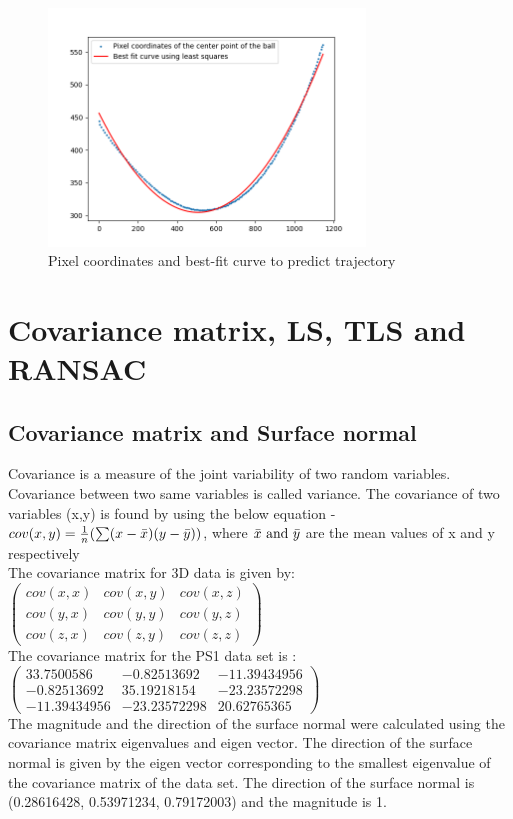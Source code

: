 \begin{figure}[!h]
    \centering
    \includegraphics[width=0.75\textwidth]{txt/Proj1_1.png}
    \caption{Pixel coordinates and best-fit curve to predict trajectory}
    \label{fig:my_label} 
\end{figure} 

\section{Covariance matrix, LS, TLS and RANSAC}
\subsection{Covariance matrix and Surface normal}
  Covariance is a measure of the joint variability of two random variables. Covariance between two same variables is called variance. The covariance of two variables (x,y) is found by using the below equation - \\
$cov(x,y) = \frac{1}{n} (\sum (x - \Bar{x})(y - \Bar{y}))$, where $\Bar{x} \text{ and } \Bar{y}$ are the mean values of x and y respectively\\
 The covariance matrix for 3D data is given by:
 $
 \begin{pmatrix}
     cov(x, x) & cov(x, y) & cov(x, z) \\
     cov(y, x) & cov(y, y) & cov(y, z) \\
     cov(z, x) & cov(z, y) & cov(z, z)
 \end{pmatrix}
 $ \\ 
The covariance matrix for the PS1 data set is :
$
\begin{pmatrix}
    33.7500586 &   -0.82513692 & -11.39434956 \\
    -0.82513692 &  35.19218154 & -23.23572298 \\
    -11.39434956 & -23.23572298  & 20.62765365 
\end{pmatrix} $  \vspace{5mm} \\
The magnitude and the direction of the surface normal were calculated using the covariance matrix eigenvalues and eigen vector. The direction of the surface normal is given by the eigen vector corresponding to the smallest eigenvalue of the covariance matrix of the data set. The direction of the surface normal is (0.28616428, 0.53971234, 0.79172003) and the magnitude is 1.

